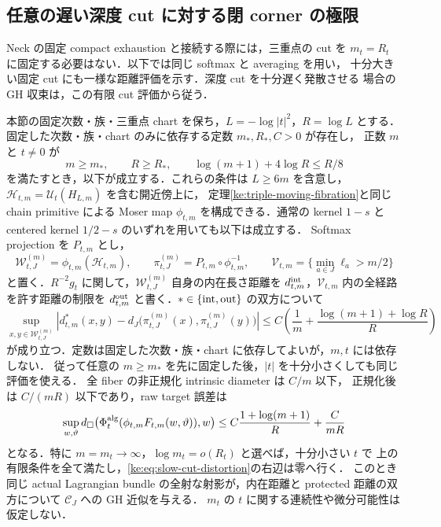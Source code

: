\subsection{任意の遅い深度 cut に対する閉 corner の極限}

Neck の固定 compact exhaustion と接続する際には，三重点の cut を
$m_t=R_t$ に固定する必要はない．以下では同じ softmax と averaging を用い，
十分大きい固定 cut にも一様な距離評価を示す．深度 cut を十分遅く発散させる
場合の GH 収束は，この有限 cut 評価から従う．

\begin{theorem}
\label{ke:slow-cut-closed-corner-gh}
本節の固定次数・族・三重点 chart を保ち，$L=-\log|t|^2$，$R=\log L$ とする．
固定した次数・族・chart のみに依存する定数 $m_*,R_*,C>0$ が存在し，
正数 $m$ と $t\ne0$ が
\[
 m\ge m_*,\qquad R\ge R_*,\qquad
 \log(m+1)+4\log R\le R/8
\]
を満たすとき，以下が成立する．これらの条件は $L\ge6m$ を含意し，
$\mathcal H_{t,m}=\mathcal U_t(H_{L,m})$ を含む開近傍上に，
定理\ref{ke:triple-moving-fibration}と同じ chain primitive による
Moser map $\phi_{t,m}$ を構成できる．通常の kernel $1-s$ と
centered kernel $1/2-s$ のいずれを用いても以下は成立する．
Softmax projection を $P_{t,m}$ とし，
\[
 \mathcal W_{t,J}^{(m)}=\phi_{t,m}(\mathcal H_{t,m}),\qquad
 \pi_{t,J}^{(m)}=P_{t,m}\circ\phi_{t,m}^{-1},\qquad
 \mathcal V_{t,m}=\{\min_{a\in J}\ell_a>m/2\}
\]
と置く．$R^{-2}g_t$ に関して，$\mathcal W_{t,J}^{(m)}$ 自身の内在長さ距離を
$d_{t,m}^{\rm int}$，$\mathcal V_{t,m}$ 内の全経路を許す距離の制限を
$d_{t,m}^{\rm out}$ と書く．$\ast\in\{{\rm int},{\rm out}\}$ の双方について
\begin{equation}\label{ke:eq:slow-cut-distortion}
 \sup_{x,y\in\mathcal W_{t,J}^{(m)}}
 \left|d_{t,m}^{\ast}(x,y)
   -d_J\bigl(\pi_{t,J}^{(m)}(x),\pi_{t,J}^{(m)}(y)\bigr)\right|
 \le C\left(\frac1m+\frac{\log(m+1)+\log R}{R}\right)
\end{equation}
が成り立つ．定数は固定した次数・族・chart に依存してよいが，$m,t$ には依存しない．
従って任意の $m\ge m_*$ を先に固定した後，$|t|$ を十分小さくしても同じ評価を使える．
全 fiber の非正規化 intrinsic diameter は $C/m$ 以下，
正規化後は $C/(mR)$ 以下であり，raw target 誤差は
\[
 \sup_{w,\vartheta}d_\square\bigl(
 \Phi_t^{\rm alg}(\phi_{t,m}F_{t,m}(w,\vartheta)),w\bigr)
 \le C\frac{1+\log(m+1)}R+\frac C{mR}
\]
となる．特に $m=m_t\to\infty$，$\log m_t=o(R_t)$ と選べば，十分小さい $t$ で
上の有限条件を全て満たし，\eqref{ke:eq:slow-cut-distortion}の右辺は零へ行く．
このとき同じ actual Lagrangian bundle の全射な射影が，内在距離と protected
距離の双方について $\mathcal C_J$ への GH 近似を与える．
$m_t$ の $t$ に関する連続性や微分可能性は仮定しない．
\end{theorem}

